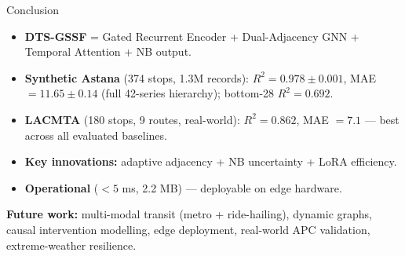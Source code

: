 \documentclass[aspectratio=169, 11pt]{beamer}
\begin{document}
\begin{frame}{Conclusion}
\vspace{0.2em}
\begin{itemize}
  \item \textbf{DTS-GSSF} = Gated Recurrent Encoder + Dual-Adjacency GNN + Temporal Attention + NB output.
  \vspace{0.4em}
  \item \textbf{Synthetic Astana} (374 stops, 1.3M records): $R^2 = 0.978 \pm 0.001$, MAE $= 11.65 \pm 0.14$ (full 42-series hierarchy); bottom-28 $R^2 = 0.692$.
  \vspace{0.4em}
  \item \textbf{LACMTA} (180 stops, 9 routes, real-world): $R^2 = 0.862$, MAE $= 7.1$ --- best across all evaluated baselines.
  \vspace{0.4em}
  \item \textbf{Key innovations:} adaptive adjacency + NB uncertainty + LoRA efficiency.
  \vspace{0.4em}
  \item \textbf{Operational} ($<5$ ms, 2.2 MB) --- deployable on edge hardware.
\end{itemize}

\vspace{0.5em}
\textbf{Future work:} multi-modal transit (metro + ride-hailing), dynamic graphs, causal intervention modelling, edge deployment, real-world APC validation, extreme-weather resilience.
\end{frame}
\end{document}
